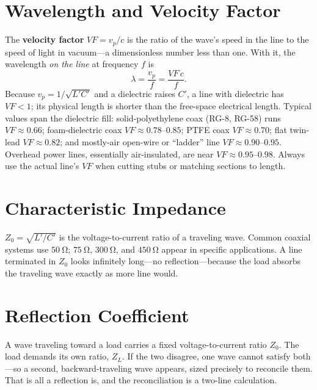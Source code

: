 \section{Wavelength and Velocity Factor}
The \textbf{velocity factor} \(VF=v_p/c\) is the ratio of the wave's speed in the
line to the speed of light in vacuum---a dimensionless number less than one. With it,
the wavelength \emph{on the line} at frequency \(f\) is
\[
\lambda=\frac{v_p}{f}=\frac{VF\,c}{f}.
\]
Because \(v_p=1/\sqrt{L'C'}\) and a dielectric raises \(C'\), a line
with dielectric has \(VF<1\); its physical length is shorter than the free-space
electrical length. Typical values span the dielectric fill: solid-polyethylene
coax (RG-8, RG-58) runs \(VF\approx0.66\); foam-dielectric coax
\(VF\approx0.78\text{--}0.85\); PTFE coax \(VF\approx0.70\); flat twin-lead
\(VF\approx0.82\); and mostly-air open-wire or ``ladder'' line
\(VF\approx0.90\text{--}0.95\). Overhead power lines, essentially air-insulated,
are near \(VF\approx0.95\text{--}0.98\). Always use the actual line's \(VF\) when
cutting stubs or matching sections to length.

\section{Characteristic Impedance}
\(Z_0=\sqrt{L'/C'}\) is the voltage-to-current ratio of a traveling wave. Common
coaxial systems use \(\SI{50}{\ohm}\); \(\SI{75}{\ohm}\), \(\SI{300}{\ohm}\), and
\(\SI{450}{\ohm}\) appear in specific applications. A line terminated in \(Z_0\)
looks infinitely long---no reflection---because the load absorbs the traveling
wave exactly as more line would.

\section{Reflection Coefficient}
A wave traveling toward a load carries a fixed voltage-to-current ratio \(Z_0\). The
load demands its own ratio, \(Z_L\). If the two disagree, one wave cannot satisfy
both---so a second, backward-traveling wave appears, sized precisely to reconcile
them. That is all a reflection is, and the reconciliation is a two-line calculation.

